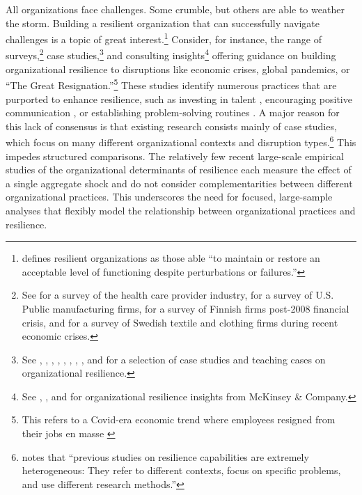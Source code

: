\documentclass[12pt,notitlepage]{article}
\begin{document}
All organizations face challenges. 
Some crumble, but others are able to weather the storm. 
Building a resilient organization that can successfully navigate challenges is a topic of great interest.\footnote{\citealt{robert_organizational_2009} defines resilient organizations as those able ``to maintain or restore an acceptable level of functioning despite perturbations or failures.''}
Consider, for instance, the range of surveys,\footnote{See \cite{mallak_1998_health} for a survey of the health care provider industry, \cite{danneels_organizational_2008} for a survey of U.S. Public manufacturing firms, \cite{MAKKONEN20142707} for a survey of Finnish firms post-2008 financial crisis, and \cite{PAL2014410} for a survey of Swedish textile and clothing firms during recent economic crises.} case studies,\footnote{See \cite{sheffi_supply_2005}, \cite{mcmanus_faciliated_2008}, \cite{crichton_enhancing_2009}, \cite{dutton_heart_2010}, \cite{LENGNICKHALL2011243}, \cite{carmeli_capture_2011}, \cite{suarez_building_2020}, \cite{tang_business_2025}, and \cite{atkinson_organizational_2023} for a selection of case studies and teaching cases on organizational resilience.} and consulting insights\footnote{See \cite{maor_raising_2022}, \cite{maor_foster_2023}, and \cite{kristensen_building_2025} for organizational resilience insights from McKinsey \& Company.} offering guidance on building organizational resilience to disruptions like economic crises, global pandemics, or ``The Great Resignation.''\footnote{This refers to a Covid-era economic trend where employees resigned from their jobs en masse \citep{GreatResignationWikipedia}}
These studies identify numerous practices that are purported to enhance resilience, such as investing in talent \citep{maor_raising_2022}, encouraging positive communication \citep{luthans_psychological_2006}, or establishing problem-solving routines \citep{suarez_building_2020}.
A major reason for this lack of consensus is that existing research consists mainly of case studies, which focus on many different organizational contexts and disruption types.\footnote{\cite{duchek_organizational_2020} notes that ``previous studies on resilience capabilities are extremely heterogeneous: They refer to different contexts, focus on specific problems, and use different research methods.''}
This impedes structured comparisons.
The relatively few recent large-scale empirical studies of the organizational determinants of resilience each measure the effect of a single aggregate shock and do not consider complementarities between different organizational practices. 
This underscores the need for focused, large-sample analyses that flexibly model the relationship between organizational practices and resilience.
\end{document}
